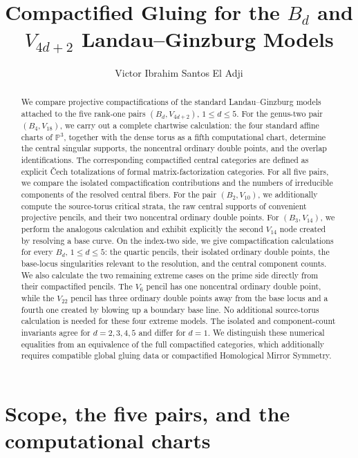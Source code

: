 \documentclass[11pt]{amsart}
\theoremstyle{definition}
\theoremstyle{remark}
\begin{document}
\title[Compactified gluing for $B_d$ and $V_{4d+2}$]{Compactified Gluing for the $B_d$ and $V_{4d+2}$ Landau--Ginzburg Models}
\author{Victor Ibrahim Santos El Adji}
\date{}

\begin{abstract}
We compare projective compactifications of the standard Landau--Ginzburg
models attached to the five rank-one pairs $(B_d,V_{4d+2})$, $1\leq d\leq5$.
For the genus-two pair $(B_4,V_{18})$, we carry out a complete chartwise
calculation: the four standard affine charts of $\mathbb P^3$, together with
the dense torus as a fifth computational chart, determine the central
singular supports, the noncentral ordinary double points, and the overlap
identifications.  The corresponding compactified central categories are
defined as explicit Čech totalizations of formal matrix-factorization
categories.  For all five pairs, we compare the isolated compactification
contributions and the numbers of irreducible components of the resolved
central fibers.  For the pair $(B_2,V_{10})$, we additionally compute the
source-torus critical strata, the raw central supports of convenient
projective pencils, and their two noncentral ordinary double points.  For
$(B_3,V_{14})$, we perform the analogous calculation and exhibit explicitly
the second $V_{14}$ node created by resolving a base curve.  On the
index-two side, we give compactification calculations for every $B_d$,
$1\leq d\leq5$: the quartic pencils, their isolated ordinary double points,
the base-locus singularities relevant to the resolution, and the central
component counts.  We also calculate the two remaining extreme cases on the
prime side directly from their compactified pencils.  The $V_6$ pencil has
one noncentral ordinary double point, while the $V_{22}$ pencil has three
ordinary double points away from the base locus and a fourth one created by
blowing up a boundary base line.  No additional source-torus calculation is
needed for these four extreme models.  The isolated and component-count
invariants agree for $d=2,3,4,5$ and differ for $d=1$.  We distinguish these numerical equalities
from an equivalence of the full compactified categories, which additionally
requires compatible global gluing data or compactified Homological Mirror
Symmetry.
\end{abstract}
\maketitle

\section{Scope, the five pairs, and the computational charts}
\end{document}
